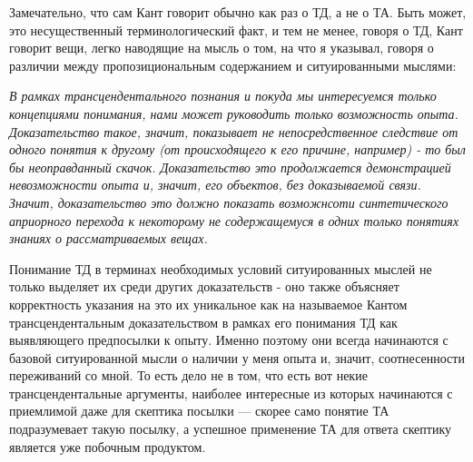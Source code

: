 \documentclass{article}
\begin{document}
Замечательно, что сам Кант говорит обычно как раз о ТД, а не о ТА. Быть может, это несущественный терминологический факт, и тем не менее, говоря о ТД, Кант говорит вещи, легко наводящие на мысль о том, на что я указывал, говоря о различии между пропозициональным содержанием и ситуированными мыслями:

\textit{В рамках трансцендентального познания и покуда мы интересуемся только концепциями понимания, нами может руководить только возможность опыта. Доказательство такое, значит, показывает не непосредственное следствие от одного понятия к другому (от происходящего к его причине, например) - то был бы неоправданный скачок. Доказательство это продолжается демонстрацией невозможности опыта и, значит, его объектов, без доказываемой связи. Значит, доказательство это должно показать возможнсоти синтетического априорного перехода к некоторому не содержащемуся в одних только понятиях знаниях о рассматриваемых вещах.}

Понимание ТД в терминах необходимых условий ситуированных мыслей не только выделяет их среди других доказательств - оно также объясняет корректность указания на это их уникальное как на называемое Кантом трансцендентальным доказательством в рамках его понимания ТД как выявляющего предпосылки к опыту. Именно поэтому они всегда начинаются с базовой ситуированной мысли о наличии у меня опыта и, значит, соотнесенности переживаний со мной. То есть дело не в том, что есть вот некие трансцендентальные аргументы, наиболее интересные из которых начинаются с приемлимой даже для скептика посылки — скорее само понятие ТА подразумевает такую посылку, а успешное применение ТА для ответа скептику является уже побочным продуктом.
\end{document}
